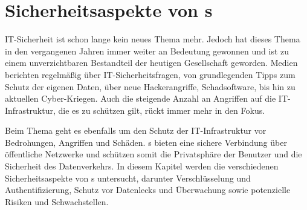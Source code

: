 \chapter{Sicherheitsaspekte von s} \label{sicherheitsaspekte}

IT-Sicherheit ist schon lange kein neues Thema mehr. Jedoch hat dieses Thema in den vergangenen Jahren immer weiter an Bedeutung gewonnen und ist zu einem unverzichtbaren Bestandteil der heutigen Gesellschaft geworden. Medien berichten regelmäßig über IT-Sicherheitsfragen, von grundlegenden Tipps zum Schutz der eigenen Daten, über neue Hackerangriffe, Schadsoftware, bis hin zu aktuellen Cyber-Kriegen. Auch die steigende Anzahl an Angriffen auf die IT-Infrastruktur, die es zu schützen gilt, rückt immer mehr in den Fokus. \cite{BSILagebericht2023}

Beim Thema  geht es ebenfalls um den Schutz der IT-Infrastruktur vor Bedrohungen, Angriffen und Schäden. s bieten eine sichere Verbindung über öffentliche Netzwerke und schützen somit die Privatsphäre der Benutzer und die Sicherheit des Datenverkehrs. In diesem Kapitel werden die verschiedenen Sicherheitsaspekte von s untersucht, darunter Verschlüsselung und Authentifizierung, Schutz vor Datenlecks und Überwachung sowie potenzielle Risiken und Schwachstellen.